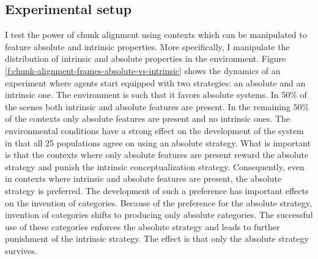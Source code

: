 \subsection{Experimental setup}
I test the power of chunk alignment using contexts which can be manipulated to feature 
absolute and intrinsic properties. More specifically, I manipulate the distribution of intrinsic and 
absolute properties in the environment. Figure \ref{f:chunk-alignment-frames-absolute-vs-intrinsic} 
shows the dynamics of an experiment where agents start equipped with two strategies: an absolute
and an intrinsic one. The environment is such that it favors absolute systems. In $50\si{\percent}$ of the 
scenes both intrinsic and absolute features are present. In the remaining $50\si{\percent}$ of the contexts
only absolute features are present and no intrinsic ones. The environmental
conditions have a strong effect on the development of the system in that all 25 populations
agree on using an absolute strategy. What is important is that the contexts where
only absolute features are present reward the absolute strategy and punish the intrinsic 
conceptualization strategy. Consequently, even in contexts where intrinsic and absolute features 
are present, the absolute strategy is preferred. The development of such a preference
has important effects on the invention of categories. Because of the preference for 
the absolute strategy, invention of categories shifts to producing only absolute categories.
The successful use of these categories enforces the absolute strategy and leads to further
punishment of the intrinsic strategy. The effect is that only the absolute strategy survives.

